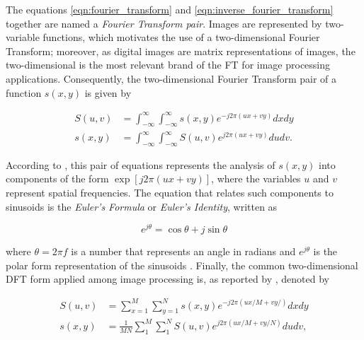 The equations \ref{eqn:fourier_transform} and \ref{eqn:inverse_fourier_transform} together are named a \emph{Fourier Transform pair}. Images are represented by two-variable functions, which motivates the use of a two-dimensional Fourier Transform; moreover, as digital images are matrix representations of images, the two-dimensional  is the most relevant brand of the FT for image processing applications. Consequently, the two-dimensional Fourier Transform pair of a function $s(x,y)$ is given by

\begin{align}
\label{eqn:two_dimensional_continuous_fourier_transform}
S(u,v) &= \int_{-\infty}^{\infty}
         \int_{-\infty}^{\infty}
         s(x,y) e^{-j 2 \pi 
                    \left(
                        ux + vy
                    \right)
                  }
        dx dy\\
s(x,y) &= \int_{-\infty}^{\infty}
         \int_{-\infty}^{\infty}
         S(u,v) e^{j 2 \pi 
                    \left(
                        ux + vy
                    \right)
                  }
        du dv.
\end{align}

According to , this pair of equations represents the analysis of $s(x,y)$ into components of the form $\exp{\left[j 2 \pi (ux + vy) \right]}$, where the variables $u$ and $v$ represent spatial frequencies. The equation that relates such components to sinusoids is the \emph{Euler's Formula} or \emph{Euler's Identity}, written as

\begin{equation}
\label{eqn:euler_formula}
    e^{j\theta} = \cos{\theta} + j\sin{\theta}
\end{equation}

\noindent where $\theta = 2 \pi f$ is a number that represents an angle in radians and $e^{j\theta}$ is the polar form representation of the sinusoids \cite{gonzalez2018digital}. Finally, the common two-dimensional DFT form applied among image processing is, as reported by , denoted by

\begin{align}
\label{eqn:two_dimensional_discrete_fourier_transform}
S(u,v) &= \sum_{x = 1}^{M}
          \sum_{y = 1}^{N}
          s(x,y) e^{-j 2 \pi 
                    \left(
                        ux/M + vy/
                    \right)
                  }
        dx dy\\
s(x,y) &= \frac{1}{MN}
          \sum_{1}^{M}
          \sum_{1}^{N}
          S(u,v) e^{j 2 \pi 
                    \left(
                        ux/M + vy/N
                    \right)
                  }
        du dv,
\end{align}

